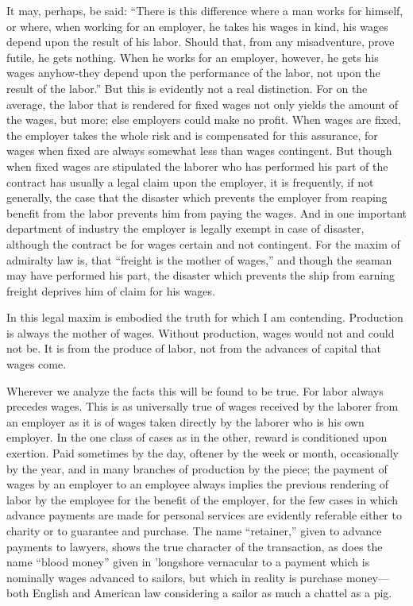 It may, perhaps, be said: ``There is this difference where a man works
for himself, or where, when working for an employer, he takes his wages
in kind, his wages depend upon the result of his labor. Should that,
from any misadventure, prove futile, he gets nothing. When he works for
an employer, however, he gets his wages anyhow-they depend upon the
performance of the labor, not upon the result of the labor.'' But this
is evidently not a real distinction. For on the average, the labor that
is rendered for fixed wages not only yields the amount of the wages, but
more; else employers could make no profit. When wages are fixed, the
employer takes the whole risk and is compensated for this assurance, for
wages when fixed are always somewhat less than wages contingent. But
though when fixed wages are stipulated the laborer who has performed his
part of the contract has usually a legal claim upon the employer, it is
frequently, if not generally, the case that the disaster which prevents
the employer from reaping benefit from the labor prevents him from
paying the wages. And in one important department of industry the
employer is legally exempt in case of disaster, although the contract be
for wages certain and not contingent. For the maxim of admiralty law is,
that ``freight is the mother of wages,'' and though the seaman may have
performed his part, the disaster which prevents the ship from earning
freight deprives him of claim for his wages.

In this legal maxim is embodied the truth for which I am contending.
Production is always the mother of wages. Without production, wages
would not and could not be. It is from the produce of labor, not from
the advances of capital that wages come.

Wherever we analyze the facts this will be found to be true. For labor
always precedes wages. This is as universally true of wages received by
the laborer from an employer as it is of wages taken directly by the
laborer who is his own employer. In the one class of cases as in the
other, reward is conditioned upon exertion. Paid sometimes by the day,
oftener by the week or month, occasionally by the year, and in many
branches of production by the piece; the payment of wages by an employer
to an employee always implies the previous rendering of labor by the
employee for the benefit of the employer, for the few cases in which
advance payments are made for personal services are evidently referable
either to charity or to guarantee and purchase. The name ``retainer,''
given to advance payments to lawyers, shows the true character of the
transaction, as does the name ``blood money'' given in 'longshore
vernacular to a payment which is nominally wages advanced to sailors,
but which in reality is purchase money---both English and American law
considering a sailor as much a chattel as a pig.

